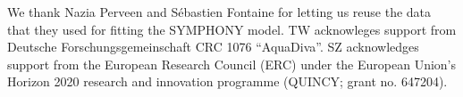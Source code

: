 \documentclass[authoryear,preprint,review,12pt]{elsarticle}
\begin{document}
\linenumbers


\begin{abstract}

\end{abstract}




\appendix

%






\begin{acknowledgements}
We thank Nazia Perveen and S\'{e}bastien Fontaine for letting us reuse the data
that they used for fitting the SYMPHONY model. TW acknowleges support from Deutsche Forschungsgemeinschaft CRC 1076
``AquaDiva''. SZ acknowledges support from the European Research Council (ERC)
under the European Union's Horizon 2020 research and innovation programme
(QUINCY; grant no. 647204).
\end{acknowledgements} 


 
 


\end{document}
